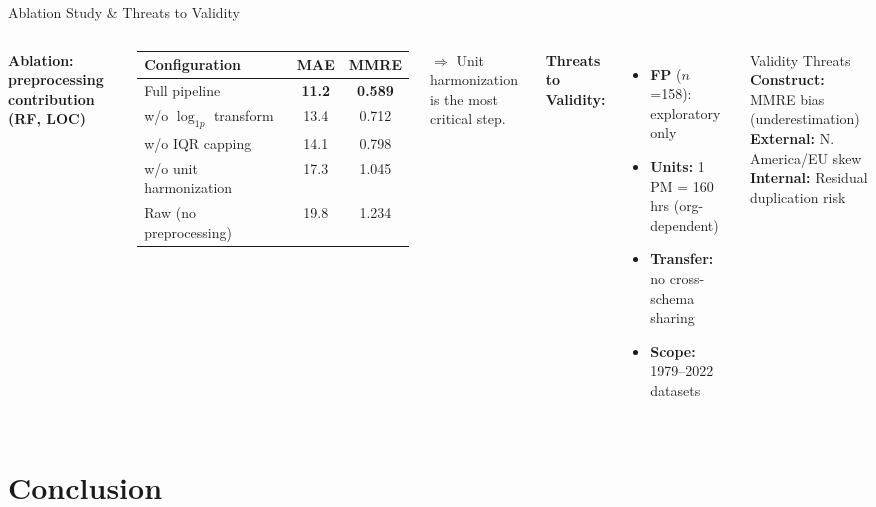 \documentclass[aspectratio=169]{beamer}
\begin{document}
\begin{frame}{Ablation Study \& Threats to Validity}
\begin{columns}[T]
\textbf{Ablation: preprocessing contribution (RF, LOC)}
\vspace{0.05cm}
\begin{table}
\scriptsize
\begin{tabular}{lcc}
\toprule
\textbf{Configuration} & \textbf{MAE} & \textbf{MMRE} \\
\midrule
Full pipeline               & \textbf{11.2} & \textbf{0.589} \\
w/o $\log_{1p}$ transform   & 13.4          & 0.712 \\
w/o IQR capping             & 14.1          & 0.798 \\
w/o unit harmonization      & 17.3          & 1.045 \\
Raw (no preprocessing)      & 19.8          & 1.234 \\
\bottomrule
\end{tabular}
\end{table}
{\scriptsize $\Rightarrow$ Unit harmonization is the most critical step.}

\textbf{Threats to Validity:}
\begin{itemize}\small
    \item \textbf{FP} ($n$=158): exploratory only
    \item \textbf{Units:} 1 PM = 160 hrs (org-dependent)
    \item \textbf{Transfer:} no cross-schema sharing
    \item \textbf{Scope:} 1979--2022 datasets
\end{itemize}

\vspace{0.1cm}
\begin{alertblock}{Validity Threats}
\small\textbf{Construct:} MMRE bias (underestimation)\\
\textbf{External:} N. America/EU skew\\
\textbf{Internal:} Residual duplication risk
\end{alertblock}
\end{columns}
\end{frame}

\section{Conclusion}
\end{document}
